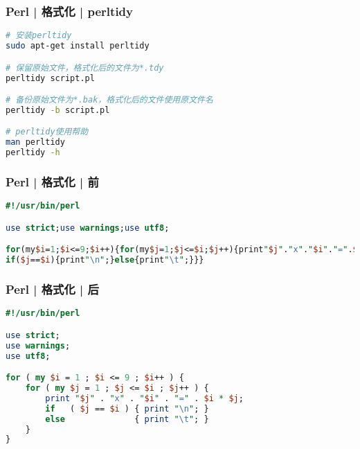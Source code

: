 \begin{frame}[fragile]
  \frametitle{Perl | 格式化 | \alert{perltidy}}
\begin{lstlisting}[language=bash]
# 安装perltidy
sudo apt-get install perltidy

# 保留原始文件，格式化后的文件为*.tdy
perltidy script.pl

# 备份原始文件为*.bak，格式化后的文件使用原文件名
perltidy -b script.pl

# perltidy使用帮助
man perltidy
perltidy -h
\end{lstlisting} 
\end{frame}

\begin{frame}[fragile]
  \frametitle{Perl | 格式化 | 前}
\begin{lstlisting}[language=Perl]
#!/usr/bin/perl 

use strict;use warnings;use utf8;

for(my$i=1;$i<=9;$i++){for(my$j=1;$j<=$i;$j++){print"$j"."x"."$i"."=".$i*$j;
if($j==$i){print"\n";}else{print"\t";}}}
\end{lstlisting} 
\end{frame}

\begin{frame}[fragile]
  \frametitle{Perl | 格式化 | \alert{后}}
\begin{lstlisting}[language=Perl,basicstyle=\small\tt]
#!/usr/bin/perl 

use strict;
use warnings;
use utf8;

for ( my $i = 1 ; $i <= 9 ; $i++ ) {
    for ( my $j = 1 ; $j <= $i ; $j++ ) {
        print "$j" . "x" . "$i" . "=" . $i * $j;
        if   ( $j == $i ) { print "\n"; }
        else              { print "\t"; }
    }
}
\end{lstlisting} 
\end{frame}

